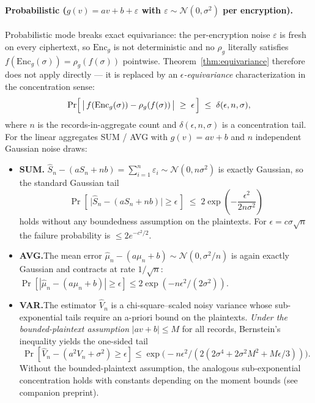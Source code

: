 \documentclass[11pt,letterpaper]{article}
\begin{document}
\paragraph{Probabilistic ($g(v) = av + b + \varepsilon$ with $\varepsilon \sim \mathcal{N}(0, \sigma^2)$ per encryption).}
Probabilistic mode breaks exact equivariance: the per-encryption
noise $\varepsilon$ is fresh on every ciphertext, so
$\mathrm{Enc}_g$ is not deterministic and no $\rho_g$ literally
satisfies
$f(\mathrm{Enc}_g(\sigma)) = \rho_g(f(\sigma))$ pointwise.
Theorem~\ref{thm:equivariance} therefore does not apply
directly --- it is replaced by an \emph{$\epsilon$-equivariance}
characterization in the concentration sense:
\[
\Pr\Bigl[\,\bigl|\,f(\mathrm{Enc}_g(\sigma))
- \rho_g(f(\sigma))\,\bigr| \;\geq\; \epsilon\,\Bigr]
\;\leq\; \delta(\epsilon, n, \sigma),
\]
where $n$ is the records-in-aggregate count and
$\delta(\epsilon, n, \sigma)$ is a concentration tail. For the
linear aggregates SUM / AVG with $g(v) = av + b$ and $n$
independent Gaussian noise draws:
\begin{itemize}[nosep]
\item \textbf{SUM.}\quad
  $\widehat{S}_n - (a S_n + n b) = \sum_{i=1}^n \varepsilon_i \sim
  \mathcal{N}(0, n \sigma^2)$ is exactly Gaussian, so the standard
  Gaussian tail
  \[
  \Pr\!\left[\,\bigl|\widehat{S}_n - (aS_n + nb)\bigr| \geq \epsilon\,\right]
  \;\leq\; 2 \exp\!\left(-\frac{\epsilon^2}{2 n \sigma^2}\right)
  \]
  holds without any boundedness assumption on the plaintexts. For
  $\epsilon = c \sigma \sqrt{n}$ the failure probability is
  $\leq 2 e^{-c^2/2}$.
\item \textbf{AVG.}\quad The mean error
  $\widehat{\mu}_n - (a \mu_n + b) \sim \mathcal{N}(0, \sigma^2/n)$
  is again exactly Gaussian and contracts at rate $1/\sqrt{n}$:
  $\Pr[|\widehat{\mu}_n - (a\mu_n + b)| \geq \epsilon]
  \leq 2 \exp(-n \epsilon^2 / (2\sigma^2))$.
\item \textbf{VAR.}\quad The estimator
  $\widehat{V}_n$ is a chi-square--scaled noisy variance whose
  sub-exponential tails require an a-priori bound on the
  plaintexts. \emph{Under the bounded-plaintext assumption}
  $|av + b| \leq M$ for all records, Bernstein's inequality yields
  the one-sided tail
  \[
  \Pr\!\left[\widehat{V}_n - (a^2 V_n + \sigma^2) \geq \epsilon\right]
  \leq \exp\!\bigl(-n\epsilon^2 / (2(2\sigma^4 + 2\sigma^2 M^2 + M \epsilon/3))\bigr).
  \]
  Without the bounded-plaintext assumption, the analogous
  sub-exponential concentration holds with constants depending on
  the moment bounds (see companion preprint).
\end{itemize}
\end{document}
